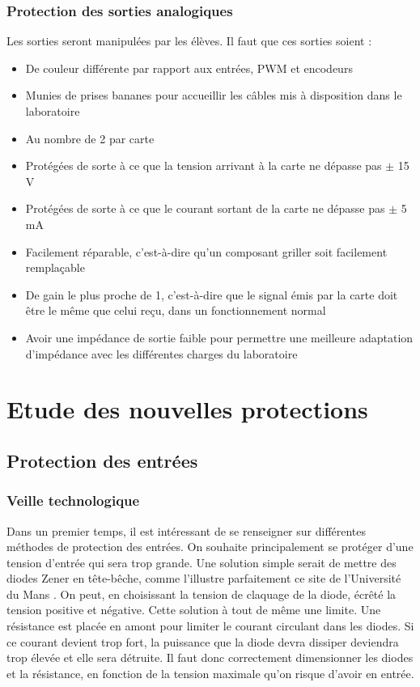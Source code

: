 \documentclass{report}
\begin{document}
\subsection{Protection des sorties analogiques}
Les sorties seront manipulées par les élèves. Il faut que ces sorties soient :
\begin{itemize}
\item De couleur différente par rapport aux entrées, PWM et encodeurs
\item Munies de prises bananes pour accueillir les câbles mis à disposition dans le laboratoire
\item Au nombre de 2 par carte
\item Protégées de sorte à ce que la tension arrivant à la carte ne dépasse pas $\pm$ 15 V
\item Protégées de sorte à ce que le courant sortant de la carte ne dépasse pas $\pm$ 5 mA
\item Facilement réparable, c'est-à-dire qu'un composant griller soit facilement remplaçable
\item De gain le plus proche de 1, c'est-à-dire que le signal émis par la carte doit être le même que celui reçu, dans un fonctionnement normal
\item Avoir une impédance de sortie faible pour permettre une meilleure adaptation d'impédance avec les différentes charges du laboratoire
\end{itemize}

\chapter{Etude des nouvelles protections}
\thispagestyle{empty}
\section{Protection des entrées}
\subsection{Veille technologique}
Dans un premier temps, il est intéressant de se renseigner sur différentes méthodes de protection des entrées. On souhaite principalement se protéger d'une tension d'entrée qui sera trop grande. Une solution simple serait de mettre des diodes Zener en tête-bêche, comme l'illustre parfaitement ce site de l'Université du Mans \cite{Rousseau}. On peut, en choisissant la tension de claquage de la diode, écrêté la tension positive et négative. Cette solution à tout de même une limite. Une résistance est placée en amont pour limiter le courant circulant dans les diodes. Si ce courant devient trop fort, la puissance que la diode devra dissiper deviendra trop élevée et elle sera détruite. Il faut donc correctement dimensionner les diodes et la résistance, en fonction de la tension maximale qu'on risque d'avoir en entrée.
\end{document}
